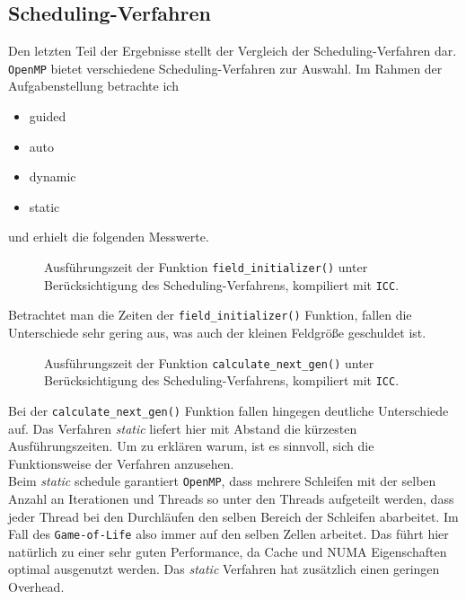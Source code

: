 \documentclass[german,plainarticle,hyperref,utf8]{zihpub}
\begin{document}
	\subsection{Scheduling-Verfahren}
	Den letzten Teil der Ergebnisse stellt der Vergleich der Scheduling-Verfahren dar. \texttt{OpenMP} bietet verschiedene Scheduling-Verfahren zur Auswahl. Im Rahmen der Aufgabenstellung betrachte ich
	\begin{itemize}
		\item guided
		\item auto
		\item dynamic
		\item static
	\end{itemize}
	und erhielt die folgenden Messwerte.
	\begin{figure}[ht]
		\begin{center}
			
		\end{center}
		\caption{Ausführungszeit der Funktion \texttt{field\_initializer()} unter Berücksichtigung des Scheduling-Verfahrens, kompiliert mit \texttt{ICC}.}
	\end{figure}
	\newline
	Betrachtet man die Zeiten der \texttt{field\_initializer()} Funktion, fallen die Unterschiede sehr gering aus, was auch der kleinen Feldgröße geschuldet ist.
	\newpage
	\begin{figure}
		\begin{center}
			
		\end{center}
		\caption{Ausführungszeit der Funktion \texttt{calculate\_next\_gen()} unter Berücksichtigung des Scheduling-Verfahrens, kompiliert mit \texttt{ICC}.}
	\end{figure}
	Bei der \texttt{calculate\_next\_gen()} Funktion fallen hingegen deutliche Unterschiede auf. Das Verfahren \textit{static} liefert hier mit Abstand die kürzesten Ausführungszeiten.
	Um zu erklären warum, ist es sinnvoll, sich die Funktionsweise der Verfahren anzusehen.\\
	
	Beim \textit{static} schedule garantiert \texttt{OpenMP}, dass mehrere Schleifen mit der selben Anzahl an Iterationen und Threads so unter den Threads aufgeteilt werden, dass jeder Thread bei den Durchläufen den selben Bereich der Schleifen abarbeitet. Im Fall des \texttt{Game-of-Life} also immer auf den selben Zellen arbeitet. Das führt hier natürlich zu einer sehr guten Performance, da Cache und NUMA Eigenschaften optimal ausgenutzt werden. Das \textit{static} Verfahren hat zusätzlich einen geringen Overhead.\\
	
\end{document}
